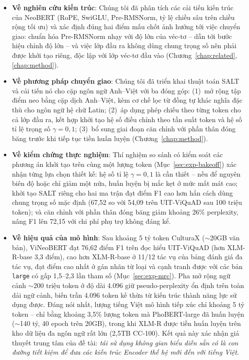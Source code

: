 \begin{itemize}
  \item \textbf{Về nghiên cứu kiến trúc}: Chúng tôi đã phân tích các cải tiến kiến
        trúc của NeoBERT (RoPE, SwiGLU, Pre-RMSNorm, tỷ lệ chiều sâu trên chiều rộng tối ưu) và xác
        định đúng hai điểm mấu chốt ảnh hưởng tới việc chuyển giao: chuẩn hóa
        Pre-RMSNorm nhạy với độ lớn của véc-tơ -- dẫn tới bước hiệu chỉnh độ lớn -- và
        việc lớp đầu ra không dùng chung trọng số nên phải được khởi tạo riêng, độc lập với lớp véc-tơ đầu vào
        (Chương~\ref{chap:related}, \ref{chap:method}).

  \item \textbf{Về phương pháp chuyển giao}: Chúng tôi đã triển khai thuật toán SALT
        và cải tiến nó cho cặp ngôn ngữ Anh--Việt với ba đóng góp: (1)~mở rộng tập điểm neo
        bằng cặp dịch Anh--Việt, kèm cơ chế lọc từ đồng tự khác nghĩa đặc thù
        cho ngôn ngữ hệ chữ Latin; (2)~áp dụng phép chiếu theo từng token cho cả lớp
        đầu ra, kết hợp khởi tạo hệ số điều chỉnh theo tần suất token và hệ số tỉ lệ trọng số $\gamma = 0{,}1$; (3)~bổ sung giai đoạn căn chỉnh với phần thân đóng băng trước khi
        tiếp tục tiền huấn luyện (Chương~\ref{chap:method}).

  \item \textbf{Về kiểm chứng thực nghiệm}: Thí nghiệm so sánh có kiểm soát các phương
        án khởi tạo trên cùng một lượng token (Mục~\ref{sec:exp-bakeoff}) xác nhận từng lựa chọn
        thiết kế: hệ số tỉ lệ $\gamma=0{,}1$ là cần thiết -- nếu để nguyên biên độ hoặc chỉ giảm
        một nửa, huấn luyện bị mắc kẹt ở mức mất mát cao; khởi tạo SALT riêng cho hai ma trận đạt
        điểm F1 cao hơn hẳn cách dùng chung trọng số mặc định (67,52 so với 54,09 trên UIT-ViQuAD
        sau 100 triệu token); và căn chỉnh với phần thân đóng băng giảm khoảng 26\% perplexity, nâng
        F1 lên 72,15 với chi phí phụ trợ không đáng kể.

  \item \textbf{Về hiệu quả của mô hình}: Sau khoảng 5 tỷ token CulturaX
        ($\sim$20GB văn bản), ViNeoBERT
        đạt 76,62 điểm F1 trên đọc hiểu UIT-ViQuAD (hơn XLM-R-base 3,3 điểm), cao hơn
        XLM-R-base ở 11/12 tác vụ của bảng đánh giá đa tác vụ, đạt điểm cao nhất
        ở gán nhãn từ loại và cạnh tranh được với các bản \texttt{large}
        có gấp 1,5--2,3 lần tham số (Mục~\ref{sec:exp-mrc}). Pha mở rộng ngữ cảnh
        $\sim$200 triệu token ở độ dài 4.096 giữ pseudo-perplexity ổn định trên toàn
        dải ngữ cảnh, biến trần 4.096 token kế thừa từ kiến trúc thành năng lực sử
        dụng được. Đáng nói nhất, lượng tiếng Việt mô hình tiếp xúc chỉ
        khoảng 5 tỷ token -- chỉ bằng khoảng 3,5\% lượng token mà PhoBERT-large đã huấn luyện
        ($\sim$140 tỷ, 40 epoch trên 20GB), trong khi XLM-R được tiền huấn luyện trên kho
        dữ liệu đa ngôn ngữ rất lớn (2,5TB CC-100). Kết
        quả này xác nhận giả thuyết trung tâm của đề tài: \textit{tái sử dụng không
        gian biểu diễn sẵn có là con đường tiết kiệm để đưa các kiến trúc Encoder thế
        hệ mới đến với tiếng Việt}.
\end{itemize}

